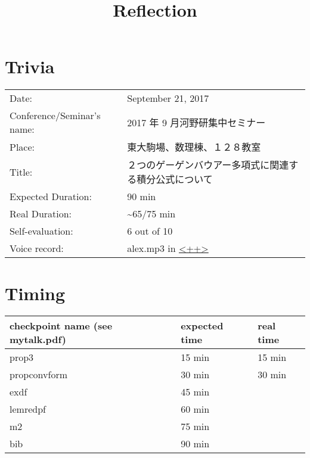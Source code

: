 \documentclass[12pt]{article} %
\title{Reflection}
\theoremstyle{theorem}
\theoremstyle{definition}
\theoremstyle{remark}
\begin{document}
	\maketitle

\section{Trivia}
\begin{center}
	\begin{tabular}[]{l|l}
		Date:&September 21, 2017\\
		Conference/Seminar's name:& 2017 年 9 月河野研集中セミナー\\
		Place:& 東大駒場、数理棟、１２８教室\\
		Title:&{２つのゲーゲンバウアー多項式に関連する積分公式について}\\
		Expected Duration:&90 min\\
        Real Duration:& \textasciitilde 65/75 min\footnotemark\\
		Self-evaluation:& 6 out of 10\\
        Voice record:&{\ttfamily alex.mp3} in \url{<++>}
	\end{tabular}
\end{center}
\section{Timing}
\begin{center}
	\begin{tabular}[]{l|l|l}
        checkpoint name (see {\ttfamily mytalk.pdf})&expected time&real time\\\hline
        prop3&15 min&15 min\\
        propconvform&30 min&30 min\\
        exdf&45 min&\\
        lemredpf&60 min&\\
        m2&75 min&\\
        bib&90 min&\\
	\end{tabular}
\end{center}
\end{document}
